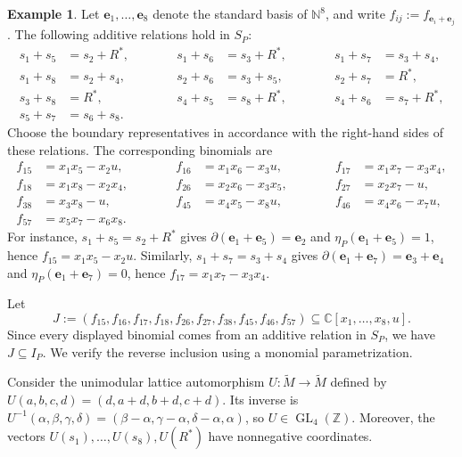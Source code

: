\documentclass[11pt]{amsart}
\numberwithin{equation}{section}
\theoremstyle{plain}
\theoremstyle{definition}
\newtheorem{example}[theorem]{Example}
\newcommand{\0}{$0$-mutable}
\newcommand{\NN}{\ensuremath{\mathbb{N}}}
\newcommand{\CC}{\ensuremath{\mathbb{C}}}
\newcommand{\ZZ}{\ensuremath{\mathbb{Z}}}
\renewcommand{\1}{$1$-rigid}
\renewcommand{\0}{$0$-mutable}
\begin{document}
{\begin{example}
Let \(\mathbf e_1,\ldots,\mathbf e_8\) denote the standard basis of
\(\NN^8\), and write
\(f_{ij}:=f_{\mathbf e_i+\mathbf e_j}\). The following additive
relations hold in \(S_P\):
\[
\begin{alignedat}{3}
s_1+s_5&=s_2+R^*,
&\hspace{3em}
s_1+s_6&=s_3+R^*,
&\hspace{3em}
s_1+s_7&=s_3+s_4,
\\
s_1+s_8&=s_2+s_4,
&\hspace{3em}
s_2+s_6&=s_3+s_5,
&\hspace{3em}
s_2+s_7&=R^*,
\\
s_3+s_8&=R^*,
&\hspace{3em}
s_4+s_5&=s_8+R^*,
&\hspace{3em}
s_4+s_6&=s_7+R^*,
\\
s_5+s_7&=s_6+s_8.
\end{alignedat}
\]
Choose the boundary representatives in accordance with the right-hand
sides of these relations. The corresponding binomials are
\[
\begin{alignedat}{3}
f_{15}&=x_1x_5-x_2u,
&\hspace{3em}
f_{16}&=x_1x_6-x_3u,
&\hspace{3em}
f_{17}&=x_1x_7-x_3x_4,
\\
f_{18}&=x_1x_8-x_2x_4,
&\hspace{3em}
f_{26}&=x_2x_6-x_3x_5,
&\hspace{3em}
f_{27}&=x_2x_7-u,
\\
f_{38}&=x_3x_8-u,
&\hspace{3em}
f_{45}&=x_4x_5-x_8u,
&\hspace{3em}
f_{46}&=x_4x_6-x_7u,
\\
f_{57}&=x_5x_7-x_6x_8.
\end{alignedat}
\]
For instance, \(s_1+s_5=s_2+R^*\) gives
\(\partial(\mathbf e_1+\mathbf e_5)=\mathbf e_2\) and
\(\eta_P(\mathbf e_1+\mathbf e_5)=1\), hence
\(f_{15}=x_1x_5-x_2u\). Similarly, \(s_1+s_7=s_3+s_4\) gives
\(\partial(\mathbf e_1+\mathbf e_7)=\mathbf e_3+\mathbf e_4\) and
\(\eta_P(\mathbf e_1+\mathbf e_7)=0\), hence
\(f_{17}=x_1x_7-x_3x_4\).

Let
\[
J:=
(f_{15},f_{16},f_{17},f_{18},f_{26},
 f_{27},f_{38},f_{45},f_{46},f_{57})
\subseteq\CC[x_1,\ldots,x_8,u].
\]
Since every displayed binomial comes from an additive relation in
\(S_P\), we have \(J\subseteq I_P\). We verify the reverse inclusion
using a monomial parametrization.

Consider the unimodular lattice automorphism
\(U\colon\widetilde M\to\widetilde M\) defined by
\(U(a,b,c,d)=(d,a+d,b+d,c+d)\). Its inverse is
\(U^{-1}(\alpha,\beta,\gamma,\delta)
=(\beta-\alpha,\gamma-\alpha,\delta-\alpha,\alpha)\), so
\(U\in\operatorname{GL}_4(\ZZ)\). Moreover, the vectors
\(U(s_1),\ldots,U(s_8),U(R^*)\) have nonnegative coordinates.


\end{example}}
\end{document}
